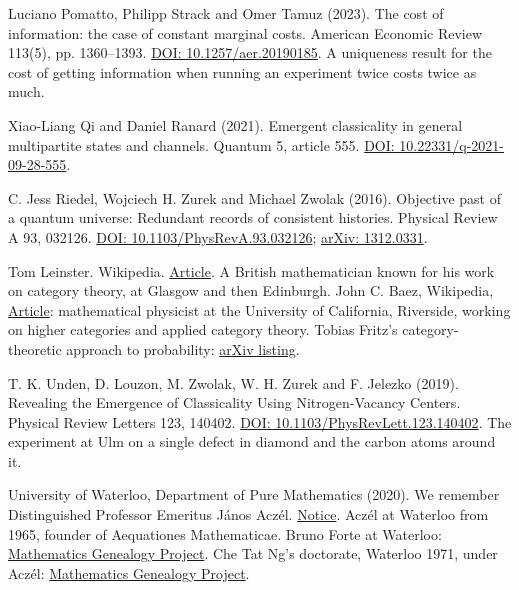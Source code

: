 \noindent Luciano Pomatto, Philipp Strack and Omer Tamuz (2023). The cost of information: the case of constant marginal costs. American Economic Review 113(5), pp. 1360--1393. \href{https://doi.org/10.1257/aer.20190185}{DOI: 10.1257/aer.20190185}. A uniqueness result for the cost of getting information when running an experiment twice costs twice as much.
\par\medskip

\noindent Xiao-Liang Qi and Daniel Ranard (2021). Emergent classicality in general multipartite states and channels. Quantum 5, article 555. \href{https://doi.org/10.22331/q-2021-09-28-555}{DOI: 10.22331/q-2021-09-28-555}.
\par\medskip

\noindent C. Jess Riedel, Wojciech H. Zurek and Michael Zwolak (2016). Objective past of a quantum universe: Redundant records of consistent histories. Physical Review A 93, 032126. \href{https://doi.org/10.1103/PhysRevA.93.032126}{DOI: 10.1103/PhysRevA.93.032126}; \href{https://arxiv.org/abs/1312.0331}{arXiv: 1312.0331}.
\par\medskip

\noindent Tom Leinster. Wikipedia. \href{https://en.wikipedia.org/wiki/Tom_Leinster}{Article}. A British mathematician known for his work on category theory, at Glasgow and then Edinburgh. John C. Baez, Wikipedia, \href{https://en.wikipedia.org/wiki/John_C._Baez}{Article}: mathematical physicist at the University of California, Riverside, working on higher categories and applied category theory. Tobias Fritz's category-theoretic approach to probability: \href{https://arxiv.org/a/fritz_t_1}{arXiv listing}.
\par\medskip

\noindent T. K. Unden, D. Louzon, M. Zwolak, W. H. Zurek and F. Jelezko (2019). Revealing the Emergence of Classicality Using Nitrogen-Vacancy Centers. Physical Review Letters 123, 140402. \href{https://doi.org/10.1103/PhysRevLett.123.140402}{DOI: 10.1103/PhysRevLett.123.140402}. The experiment at Ulm on a single defect in diamond and the carbon atoms around it.
\par\medskip

\noindent University of Waterloo, Department of Pure Mathematics (2020). We remember Distinguished Professor Emeritus János Aczél. \href{https://uwaterloo.ca/pure-mathematics/news/we-remember-distinguished-professor-emeritus-janos-aczel}{Notice}. Aczél at Waterloo from 1965, founder of Aequationes Mathematicae. Bruno Forte at Waterloo: \href{https://mathgenealogy.com/id.php?id=30611}{Mathematics Genealogy Project}. Che Tat Ng's doctorate, Waterloo 1971, under Aczél: \href{https://mathgenealogy.org/id.php?id=102040}{Mathematics Genealogy Project}.
\par\medskip

